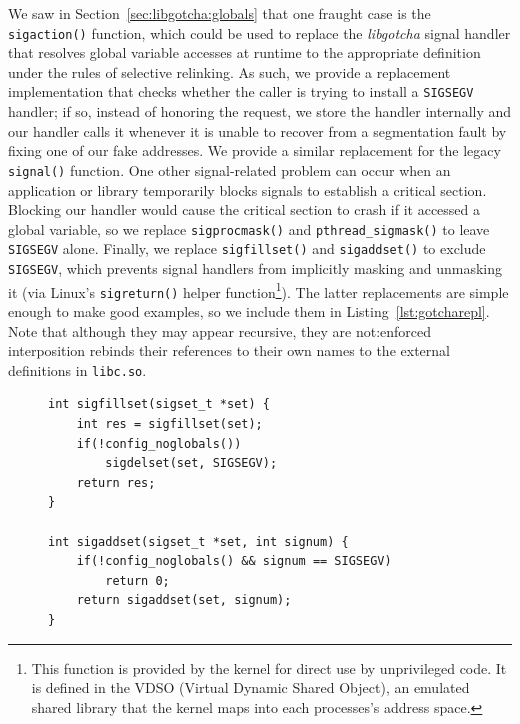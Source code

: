We saw in Section~\ref{sec:libgotcha:globals} that one fraught case is the
\texttt{sigaction()} function, which could be used to replace the \textit{libgotcha}
signal handler that resolves global variable accesses at runtime to the appropriate
definition under the rules of selective relinking.  As such, we provide a replacement
implementation that checks whether the caller is trying to install a \texttt{SIGSEGV}
handler; if so, instead of honoring the request, we store the handler internally and
our handler calls it whenever it is unable to recover from a segmentation fault by
fixing one of our fake addresses.  We provide a similar replacement for the legacy
\texttt{signal()} function.  One other signal-related problem can occur when an
application or library temporarily blocks signals to establish a critical section.
Blocking our handler would cause the critical section to crash if it accessed a
global variable, so we replace \texttt{sigprocmask()} and \texttt{pthread\_sigmask()}
to leave \texttt{SIGSEGV} alone.  Finally, we replace \texttt{sigfillset()} and
\texttt{sigaddset()} to exclude \texttt{SIGSEGV}, which prevents signal handlers from
implicitly masking and unmasking it (via Linux's \texttt{sigreturn()} helper
function\footnote{This function is provided by the kernel for direct use by
unprivileged code.  It is defined in the VDSO (Virtual Dynamic Shared Object), an
emulated shared library that the kernel maps into each processes's address space.}).
The latter replacements are simple enough
to make good examples, so we include them in Listing~\ref{lst:gotcharepl}.  Note that
although they may appear recursive, they are not:\@ enforced interposition rebinds
their references to their own names to the external definitions in \texttt{libc.so}.

\begin{figure}
\begin{lstlisting}[label=lst:gotcharepl,caption=\textit{libgotcha} \texttt{sigfillset()} and \texttt{sigaddset()} replacements]
int sigfillset(sigset_t *set) {
	int res = sigfillset(set);
	if(!config_noglobals())
		sigdelset(set, SIGSEGV);
	return res;
}

int sigaddset(sigset_t *set, int signum) {
	if(!config_noglobals() && signum == SIGSEGV)
		return 0;
	return sigaddset(set, signum);
}
\end{lstlisting}
\end{figure}

